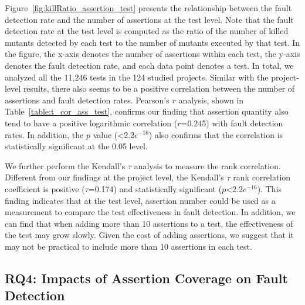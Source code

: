Figure~\ref{fig:killRatio_assertion_test} presents the relationship
between the fault detection rate and the number of assertions at the
test level. Note that the fault detection rate at the test level is
computed as the ratio of the number of killed mutants detected by each
test to the number of mutants executed by that test. In the figure,
the {x-axis} denotes the number of assertions within each test, the
{y-axis} denotes the fault detection rate, and each data point denotes
a test. In total, we analyzed all the 11,246 tests in the 124 studied
projects. Similar with the project-level
results, there also seems to be a positive correlation between the
number of assertions and fault detection rates. Pearson's $r$
analysis, shown in Table~\ref{table:t_cor_ass_test}, confirms our
finding that assertion quantity also tend to have a positive
logarithmic correlation ($r$=0.245) with fault detection rates. In
addition, the $p$ value (<2.2$e^{-16}$) also confirms that the
correlation is statistically significant at the 0.05 level.

We further perform the Kendall's $\tau$ analysis to measure the rank
correlation. Different from our findings at the project level, the
Kendall's $\tau$ rank correlation coefficient is positive
($\tau$=0.174) and statistically significant ($p$<2.2$e^{-16}$). This
finding indicates that at the test level, assertion number could be
used as a measurement to compare the test effectiveness in fault
detection. In addition, we can find that when adding more than 10
assertions to a test, the effectiveness of the test may grow
slowly. Given the cost of adding assertions, we suggest that it may
not be practical to include more than 10 assertions in each test.



\subsection{RQ4: Impacts of Assertion Coverage on Fault Detection}


